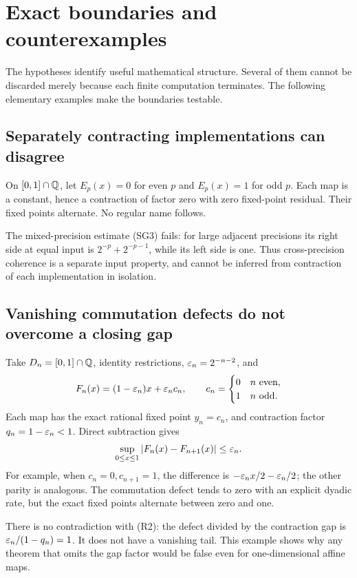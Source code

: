 \section{Exact boundaries and counterexamples}
\label{sec:boundaries}

The hypotheses identify useful mathematical structure. Several of them
cannot be discarded merely because each finite computation terminates.
The following elementary examples make the boundaries testable.

\subsection{Separately contracting implementations can disagree}

On \([0,1]\cap\mathbb Q\), let \(E_p(x)=0\) for even \(p\) and
\(E_p(x)=1\) for odd \(p\). Each map is a constant, hence a
contraction of factor zero with zero fixed-point residual. Their
fixed points alternate. No regular name follows.

The mixed-precision estimate (SG3) fails: for large adjacent
precisions its right side at equal input is \(2^{-p}+2^{-p-1}\),
while its left side is one. Thus cross-precision coherence is a
separate input property, and cannot be inferred from contraction of
each implementation in isolation.

\subsection{Vanishing commutation defects do not overcome a closing gap}

Take \(D_n=[0,1]\cap\mathbb Q\), identity restrictions,
\(\varepsilon_n=2^{-n-2}\), and
\[
 F_n(x)=(1-\varepsilon_n)x+\varepsilon_nc_n,
 \qquad
 c_n=\begin{cases}0&n\text{ even},\\1&n\text{ odd}.
 \end{cases}
\]
Each map has the exact rational fixed point \(y_n=c_n\), and
contraction factor \(q_n=1-\varepsilon_n<1\). Direct subtraction gives
\[
 \sup_{0\le x\le1}|F_n(x)-F_{n+1}(x)|\le\varepsilon_n.
\]
For example, when \(c_n=0,c_{n+1}=1\), the difference is
\(-\varepsilon_nx/2-\varepsilon_n/2\); the other parity is analogous.
The commutation defect tends to zero with an explicit dyadic rate,
but the exact fixed points alternate between zero and one.

There is no contradiction with (R2): the defect divided by the
contraction gap is \(\varepsilon_n/(1-q_n)=1\). It does not have a
vanishing tail. This example shows why any theorem that omits the gap
factor would be false even for one-dimensional affine maps.

